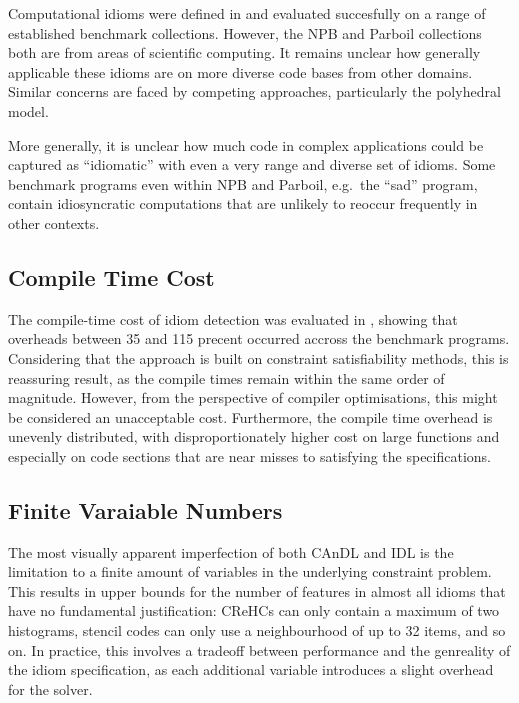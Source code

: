     Computational idioms were defined in
     and
    evaluated succesfully on a range of established benchmark collections.
    However, the NPB and Parboil collections both are from areas of scientific
    computing.
    It remains unclear how generally applicable these idioms are on more
    diverse code bases from other domains.
    Similar concerns are faced by competing approaches, particularly the
    polyhedral model.

    More generally, it is unclear how much code in complex applications could
    be captured as ``idiomatic'' with even a very range and diverse set of
    idioms.
    Some benchmark programs even within NPB and Parboil, e.g.\ the ``sad''
    program, contain idiosyncratic computations that are unlikely to reoccur
    frequently in other contexts.

\subsection*{Compile Time Cost}

    The compile-time cost of idiom detection was evaluated in
    , showing that overheads between 35 and 115 precent
    occurred accross the benchmark programs.
    Considering that the approach is built on constraint satisfiability
    methods, this is reassuring result, as the compile times remain within the
    same order of magnitude.
    However, from the perspective of compiler optimisations, this might be
    considered an unacceptable cost.
    Furthermore, the compile time overhead is unevenly distributed, with
    disproportionately higher cost on large functions and especially on code
    sections that are near misses to satisfying the specifications.

\subsection*{Finite Varaiable Numbers}

    The most visually apparent imperfection of both CAnDL and IDL is the
    limitation to a finite amount of variables in the underlying constraint
    problem.
    This results in upper bounds for the number of features in almost all idioms
    that have no fundamental justification:
    CReHCs can only contain a maximum of two histograms, stencil codes can only
    use a neighbourhood of up to 32 items, and so on.
    In practice, this involves a tradeoff between performance and the genreality
    of the idiom specification, as each additional variable introduces a slight
    overhead for the solver.

